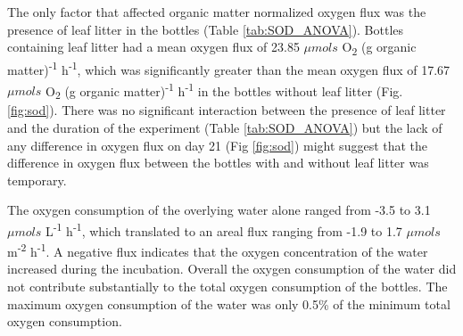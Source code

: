 The only factor that affected organic matter normalized oxygen flux was the presence of leaf litter in the bottles (Table \ref{tab:SOD_ANOVA}). Bottles containing leaf litter had a mean oxygen flux of 23.85 $\mu mols$ O\textsubscript{2} (g organic matter)\textsuperscript{-1} h\textsuperscript{-1}, which was significantly greater than the mean oxygen flux of 17.67 $\mu mols$ O\textsubscript{2} (g organic matter)\textsuperscript{-1} h\textsuperscript{-1} in the bottles without leaf litter (Fig. \ref{fig:sod}). There was no significant interaction between the presence of leaf litter and the duration of the experiment (Table \ref{tab:SOD_ANOVA}) but the lack of any difference in oxygen flux on day 21 (Fig \ref{fig:sod}) might suggest that the difference in oxygen flux between the bottles with and without leaf litter was temporary. 

The oxygen consumption of the overlying water alone ranged from -3.5 to 3.1 $\mu mols$ L\textsuperscript{-1} h\textsuperscript{-1}, which translated to an areal flux ranging from -1.9 to 1.7 $\mu mols$ m\textsuperscript{-2} h\textsuperscript{-1}. A negative flux indicates that the oxygen concentration of the water increased during the incubation. Overall the oxygen consumption of the water did not contribute substantially to the total oxygen consumption of the bottles. The maximum oxygen consumption of the water was only 0.5\% of the minimum total oxygen consumption.  




    